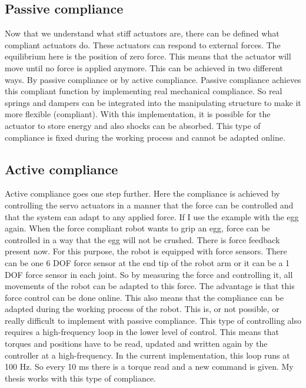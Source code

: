 \documentclass[11pt,a4paper]{report}
\begin{document}
\subsection{Passive compliance}
Now that we understand what stiff actuators are, there can be defined what compliant actuators do. These actuators can respond to external forces. The equilibrium here is the position of zero force. This means that the actuator will move until no force is applied anymore. This can be achieved in two different ways. By passive compliance or by active compliance. Passive compliance achieves this compliant function by implementing real mechanical compliance. So real springs and dampers can be integrated into the manipulating structure to make it more flexible (compliant). With this implementation, it is possible for the actuator to store energy and also shocks can be absorbed. This type of compliance is fixed during the working process and cannot be adapted online.

\subsection{Active compliance}
Active compliance goes one step further. Here the compliance is achieved by controlling the servo actuators in a manner that the force can be controlled and that the system can adapt to any applied force. If I use the example with the egg again. When the force compliant robot wants to grip an egg, force can be controlled in a way that the egg will not be crushed. There is force feedback present now. For this purpose, the robot is equipped with force sensors. There can be one 6 DOF force sensor at the end tip of the robot arm or it can be a 1 DOF force sensor in each joint. So by measuring the force and controlling it, all movements of the robot can be adapted to this force. The advantage is that this force control can be done online. This also means that the compliance can be adapted during the working process of the robot. This is, or not possible, or really difficult to implement with passive compliance. This type of controlling also requires a high-frequency loop in the lower level of control. This means that torques and positions have to be read, updated and written again by the controller at a high-frequency. In the current implementation, this loop runs at 100 Hz. So every 10 ms there is a torque read and a new command is given. My thesis works with this type of compliance.
\end{document}
